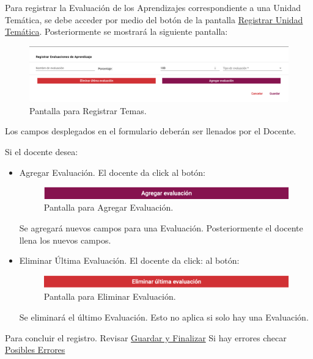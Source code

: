 Para registrar la Evaluación de los Aprendizajes correspondiente a una Unidad Temática, se debe acceder por medio del botón  de la pantalla \hyperlink{RUT}{Registrar Unidad Temática}. Posteriormente se mostrará la siguiente pantalla:

\hypertarget{REvalApre}{}
\begin{figure}[!hbtp]
    \centering
    \includegraphics[width=0.7\linewidth]{images/SP6/RegistrarEvadeApren.png}
    \caption{Pantalla para Registrar Temas.} 
\end{figure}

Los campos desplegados en el formulario deberán ser llenados por el Docente.

Si el docente desea:
\begin{itemize}
    \item Agregar Evaluación. El docente da click al botón:
    \begin{figure}[!hbtp]
    \centering
    \includegraphics[width=0.4\linewidth]{images/SP6/AgregarEval.png}
    \caption{Pantalla para Agregar Evaluación.} 
    \end{figure}
    Se agregará nuevos campos para una Evaluación. Posteriormente el docente llena los nuevos campos.
    \item Eliminar Última Evaluación. El docente da click: al botón:
    \begin{figure}[!hbtp]
    \centering
    \includegraphics[width=0.4\linewidth]{images/SP6/ElimarEval.png}
    \caption{Pantalla para Eliminar Evaluación.} 
    \end{figure}
    Se eliminará el último Evaluación. Esto no aplica si solo hay una Evaluación.
\end{itemize}

Para concluir el registro. Revisar \hyperlink{GuardarFinalizar}{Guardar y Finalizar}
Si hay errores checar \hyperlink{Errores}{Posibles Errores}
\pagebreak

